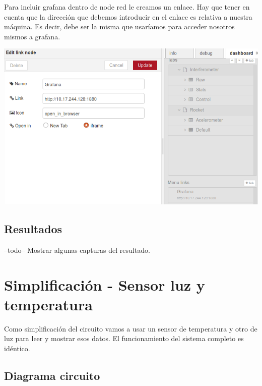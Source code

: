 \documentclass[12pt, a4paper, oneside, titlepage]{article}
\begin{document}
Para incluir grafana dentro de node red le creamos un enlace. Hay que tener en cuenta que la dirección que debemos introducir en el enlace es relativa a nuestra máquina. Es decir, debe ser la misma que usaríamos para acceder nosotros mismos a grafana. 

\includegraphics[width=0.9\linewidth,keepaspectratio]{img/node-6.png}


\subsection{Resultados}
--todo-- Mostrar algunas capturas del resultado.

\section{Simplificación - Sensor luz y temperatura}

Como simplificación del circuito vamos a usar un sensor de temperatura y otro de luz para leer y mostrar esos datos. El funcionamiento del sistema completo es idéntico.

\subsection{Diagrama circuito}
\end{document}
